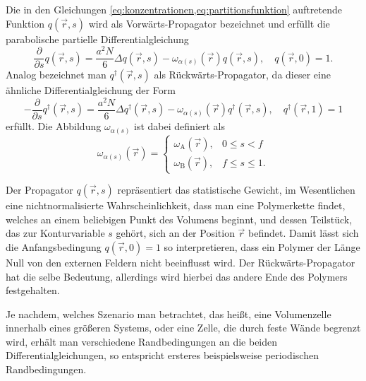Die in den Gleichungen \cref{eq:konzentrationen,eq:partitionsfunktion} auftretende Funktion $q(\vec{r}, s)$ wird als Vorwärts-Propagator bezeichnet und erfüllt die parabolische partielle Differentialgleichung
\begin{equation}
\label{eq:forward_propagator}
        \frac{\partial}{\partial s} q(\vec{r}, s) = \frac{a^{2}N}{6} \Delta q(\vec{r}, s) - \omega_{\alpha(s)}(\vec{r}) q(\vec{r}, s), \quad
        q(\vec{r}, 0) = 1.
\end{equation}
Analog bezeichnet man $q^{\dagger}(\vec{r}, s)$ als Rückwärts-Propagator, da dieser eine ähnliche Differentialgleichung der Form
\begin{equation}
\label{eq:backward_propagator}
        -\frac{\partial}{\partial s}q^{\dagger}(\vec{r}, s) = \frac{a^{2}N}{6} \Delta q^{\dagger}(\vec{r}, s) - \omega_{\alpha(s)}(\vec{r}) q^{\dagger}(\vec{r}, s), \quad
        q^{\dagger}(\vec{r}, 1) = 1
\end{equation}%
erfüllt.
Die Abbildung $\omega_{\alpha(s)}$ ist dabei definiert als
\begin{equation}
    \omega_{\alpha(s)}(\vec{r}) = \begin{cases}
        \omega_{\mathrm{A}}(\vec{r}), & 0 \leq s < f\\
        \omega_{\mathrm{B}}(\vec{r}), & f \leq s \leq 1.
    \end{cases}
\end{equation}

Der Propagator $q(\vec{r}, s)$ repräsentiert das statistische Gewicht, im Wesentlichen eine nichtnormalisierte Wahrscheinlichkeit, dass man eine Polymerkette findet, welches an einem beliebigen Punkt des Volumens beginnt, und dessen Teilstück, das zur Konturvariable $s$ gehört, sich an der Position $\vec{r}$ befindet.
Damit lässt sich die Anfangsbedingung $q(\vec r, 0) = 1$ so interpretieren, dass ein Polymer der Länge Null von den externen Feldern nicht beeinflusst wird.
Der Rückwärts-Propagator hat die selbe Bedeutung, allerdings wird hierbei das andere Ende des Polymers festgehalten.

Je nachdem, welches Szenario man betrachtet, das heißt, eine Volumenzelle innerhalb eines größeren Systems, oder eine Zelle, die durch feste Wände begrenzt wird, erhält man verschiedene Randbedingungen an die beiden Differentialgleichungen, so entspricht ersteres beispielsweise periodischen Randbedingungen.

